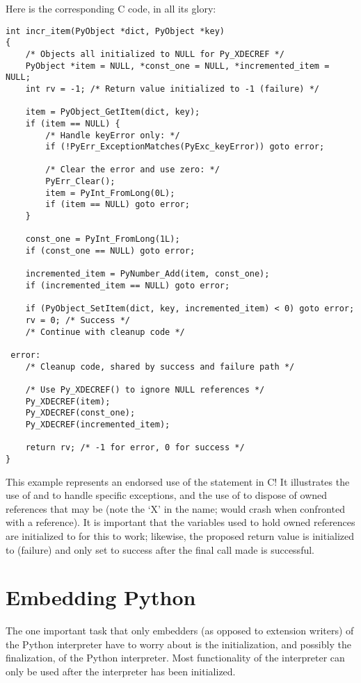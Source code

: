 Here is the corresponding C code, in all its glory:

\begin{verbatim}
int incr_item(PyObject *dict, PyObject *key)
{
    /* Objects all initialized to NULL for Py_XDECREF */
    PyObject *item = NULL, *const_one = NULL, *incremented_item = NULL;
    int rv = -1; /* Return value initialized to -1 (failure) */

    item = PyObject_GetItem(dict, key);
    if (item == NULL) {
        /* Handle keyError only: */
        if (!PyErr_ExceptionMatches(PyExc_keyError)) goto error;

        /* Clear the error and use zero: */
        PyErr_Clear();
        item = PyInt_FromLong(0L);
        if (item == NULL) goto error;
    }

    const_one = PyInt_FromLong(1L);
    if (const_one == NULL) goto error;

    incremented_item = PyNumber_Add(item, const_one);
    if (incremented_item == NULL) goto error;

    if (PyObject_SetItem(dict, key, incremented_item) < 0) goto error;
    rv = 0; /* Success */
    /* Continue with cleanup code */

 error:
    /* Cleanup code, shared by success and failure path */

    /* Use Py_XDECREF() to ignore NULL references */
    Py_XDECREF(item);
    Py_XDECREF(const_one);
    Py_XDECREF(incremented_item);

    return rv; /* -1 for error, 0 for success */
}
\end{verbatim}

This example represents an endorsed use of the  statement 
in C!  It illustrates the use of  and 
 to handle specific exceptions, and the use of 
 to dispose of owned references that may be 
\NULL{} (note the `X' in the name;  would crash 
when confronted with a \NULL{} reference).  It is important that 
the variables used to hold owned references are initialized to 
\NULL{} for this to work; likewise, the proposed return value is 
initialized to  (failure) and only set to success after
the final call made is successful.


\section{Embedding Python}

The one important task that only embedders (as opposed to extension
writers) of the Python interpreter have to worry about is the
initialization, and possibly the finalization, of the Python
interpreter.  Most functionality of the interpreter can only be used
after the interpreter has been initialized.

